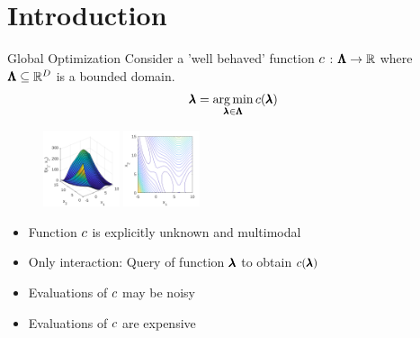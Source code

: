 \section{Introduction}
\begin{frame}[c]{Global Optimization}
Consider a 'well behaved' function $c$ : $\pmb{\Lambda} \rightarrow \mathbb{R}$ where $\pmb{\Lambda} \subseteq \mathbb{R}^D$ is a bounded domain.
\begin{equation*}
  \pmb{\lambda}=\operatorname*{arg\,min}_{\pmb{\lambda}\in\pmb{\Lambda}} c(\pmb{\lambda}) 
\end{equation*}
\begin{figure}
   \begin{multicols}{2}
    \includegraphics[width=0.2\textwidth, right]{w06_hpo_bo/images/intro_images/branin.png}
    \includegraphics[width=0.2\textwidth,left]{w06_hpo_bo/images/intro_images/branin_countour.png}
 \end{multicols}
\end{figure}
\begin{itemize}
    \item Function $c$ is explicitly unknown and multimodal
    \item Only interaction: Query of function $\pmb{\lambda}$ to obtain $c(\pmb{\lambda})$
    \item Evaluations of $c$ may be noisy
    \item Evaluations of $c$ are expensive
\end{itemize}

\tiny{ }


\end{frame}


